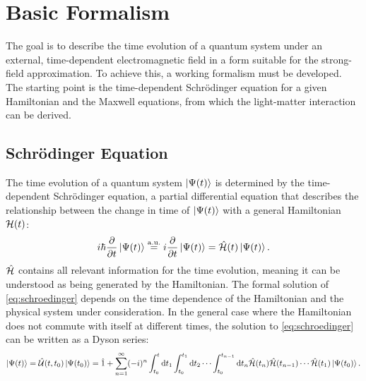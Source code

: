 \section{Basic Formalism}

The goal is to describe the time evolution of a quantum system under an external, time-dependent electromagnetic field in a form suitable for the strong-field approximation.
To achieve this, a working formalism must be developed.
The starting point is the time-dependent Schrödinger equation for a given Hamiltonian and the Maxwell equations, from which the light-matter interaction can be derived.





\subsection{Schrödinger Equation}
The time evolution of a quantum system $\ket{\Psi(t)}$ is determined by the time-dependent Schrödinger equation, a partial differential equation that describes the relationship between the change in time of $\ket{\Psi(t)}$ with a general Hamiltonian $\mathcal{H}(t)$:
\begin{equation}
    i \hbar \frac{\partial}{\partial t} \ket{\Psi(t)} \stackrel{\mathrm{a.u.}}{=} i\frac{\partial}{\partial t} \ket{\Psi(t)} = \hat{\mathcal{H}}(t) \ket{\Psi(t)}. \label{eq:schroedinger}
\end{equation}
$\hat{\mathcal{H}}$ contains all relevant information for the time evolution, meaning it can be understood as being generated by the Hamiltonian.
The formal solution of \eqref{eq:schroedinger} depends on the time dependence of the Hamiltonian and the physical system under consideration.
In the general case where the Hamiltonian does not commute with itself at different times, the solution to \eqref{eq:schroedinger} can be written as a Dyson series:
\begin{equation}
    \ket{\Psi(t)} = \hat{\mathcal{U}}(t,t_0)\ket{\Psi(t_0)} = \hat{1} + \sum_{n=1}^{\infty} (-i)^n \int_{t_0}^{t} \mathrm{d} t_1 \int_{t_0}^{t_1} \mathrm{d} t_2 \cdots \int_{t_0}^{t_{n-1}} \mathrm{d} t_n \hat{\mathcal{H}}(t_n) \hat{\mathcal{H}}(t_{n-1})\cdots\hat{\mathcal{H}}(t_1) \ket{\Psi(t_0)}. \label{eq:dyson}
\end{equation}
